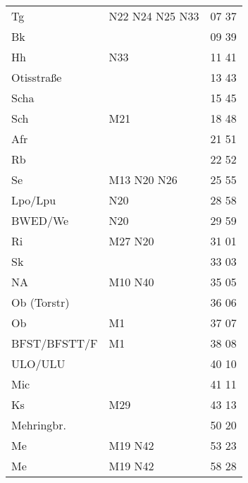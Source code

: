 \begin{tabular}{!{\color{schiefergrau}\vrule width 3pt}*{3}{l!{\color{schiefergrau}\vrule width 3pt}}}
\hline
{}
 \\
\hline
Tg           & \nbus{} N22 N24 N25 N33             & 07 37 \\
Bk           &                                     & 09 39 \\
Hh           & \nbus{} N33                         & 11 41 \\
Otisstraße   &                                     & 13 43 \\
Scha         &                                     & 15 45 \\
Sch          & \mbus{} M21                         & 18 48 \\
Afr          &                                     & 21 51 \\
Rb           &                                     & 22 52 \\
Se           & \mtram{} M13 \nbus{} N20 N26        & 25 55 \\
Lpo/Lpu      & \nuneun{} \nbus{} N20               & 28 58 \\
BWED/We      & \nbus{} N20                         & 29 59 \\
Ri           & \mbus{} M27 \nbus{} N20             & 31 01 \\
Sk           &                                     & 33 03 \\
NA           & \mtram{} M10 \nbus{} N40            & 35 05 \\
Ob (Torstr)  &                                     & 36 06 \\
Ob           & \mtram{} M1                         & 37 07 \\
BFST/BFSTT/F & \mtram{} M1                         & 38 08 \\
ULO/ULU      &                                     & 40 10 \\
Mic          & \nuzwei{}                           & 41 11 \\
Ks           & \mbus{} M29                         & 43 13 \\
Mehringbr.   & \nueins{}                           & 50 20 \\
Me           & \nusieben{} \mbus{} M19 \nbus{} N42 & 53 23 \\
\hline
Me           & \nusieben{} \mbus{} M19 \nbus{} N42 & 58 28 \\

\end{tabular}
